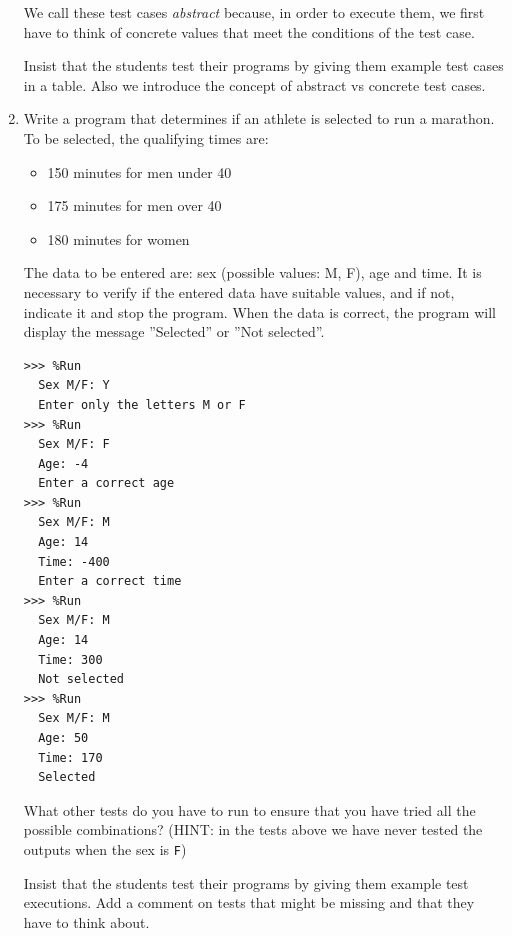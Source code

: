 \documentclass[
  fontsize=10pt,
  a4paper,
]{scrartcl}
\newenvironment{howTILEd}%
  {\begin{mdframed}[skipabove=10pt,skipbelow=10pt,backgroundcolor=pink!40]}%
  {\end{mdframed}}
\begin{document}
\begin{enumerate}
We call these test cases {\em abstract} because, in order to execute them, we first have to think of concrete values that meet the conditions of the test case.

\begin{howTILEd}
Insist that the students test their programs by giving them example test cases in a table. Also we introduce the concept of abstract vs concrete test cases. 
\end{howTILEd}

\item Write a program that determines if an athlete is selected to run a marathon. To be selected, the qualifying times are:

\begin{itemize}
    \item 150 minutes for men under 40
    \item 175 minutes for men over 40
    \item 180 minutes for women
\end{itemize}

The data to be entered are: sex (possible values: M, F), age and time. It is necessary to verify if the entered data have suitable values, and if not, indicate it and stop the program. When the data is correct, the program will display the message ''Selected'' or ''Not selected''.

\begin{small}
\begin{Verbatim}[frame=single, label={\em examples of test executions}]
>>> %Run 
  Sex M/F: Y
  Enter only the letters M or F
>>> %Run 
  Sex M/F: F
  Age: -4
  Enter a correct age
>>> %Run 
  Sex M/F: M
  Age: 14
  Time: -400
  Enter a correct time
>>> %Run 
  Sex M/F: M
  Age: 14
  Time: 300
  Not selected
>>> %Run 
  Sex M/F: M
  Age: 50
  Time: 170
  Selected
\end{Verbatim}
\end{small}

What other tests do you have to run to ensure that you have tried all the possible combinations? (HINT: in the tests above we have never tested the outputs when the sex is \verb+F+)


\begin{howTILEd}
Insist that the students test their programs by giving them example test executions.  Add a comment on tests that might be missing and that they have to think about.
\end{howTILEd}



\end{enumerate}
\end{document}

